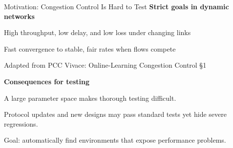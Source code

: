\source{}
\begin{frame}[t]{Motivation: Congestion Control Is Hard to Test}
\bodyfont
\vspace{8pt}
{\color{SemBlue}\textbf{Strict goals in dynamic networks}}\par
\begin{points}
\item High throughput, low delay, and low loss under changing links
\item Fast convergence to stable, fair rates when flows compete
\end{points}
{\fontsize{18.5}{22}\selectfont\color{SemGray}
Adapted from PCC Vivace: Online-Learning Congestion Control \S1\par}
\pause
\vspace{24pt}
{\color{SemBlue}\textbf{Consequences for testing}}\par
\begin{points}
\item A large parameter space makes thorough testing difficult.
\item Protocol updates and new designs may pass standard tests\newline
      yet hide severe regressions.
\item Goal: automatically find environments that expose performance problems.
\end{points}
\end{frame}

